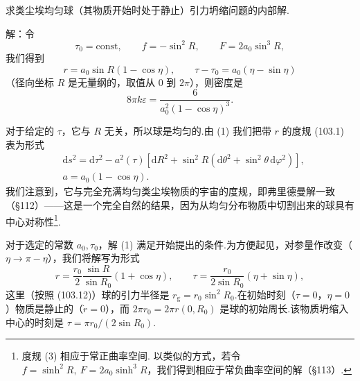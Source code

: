 \begin{xiti}

\quad 求类尘埃均匀球（其物质开始时处于静止）引力坍缩问题的内部解.

解：令
\begin{equation*}
  \tau_0=\mathrm{const},\qquad
  f=-\sin^{2}R,\qquad
  F=2a_0\sin^{3}R,
\end{equation*}
我们得到
\begin{equation}
  r=a_0\sin R(1-\cos\eta),\qquad
  \tau-\tau_0=a_0(\eta-\sin\eta)
  \tag{1}
\end{equation}
（径向坐标 $R$ 是无量纲的，取值从 0 到 $2\pi$），则密度是
\begin{equation}
  8\pi k\varepsilon=\frac{6}{a_0^{2}(1-\cos\eta)^{3}}.
  \tag{2}
\end{equation}

对于给定的 $\tau$，它与 $R$ 无关，所以球是均匀的.由 (1) 我们把带 $r$ 的度规 (103.1) 表为形式
\begin{equation}
\begin{aligned}
  &\mathrm{d}s^{2}=\mathrm{d}\tau^{2}
  -a^{2}(\tau)\left[\mathrm{d}R^{2}
  +\sin^{2}R(\mathrm{d}\theta^{2}
  +\sin^{2}\theta\,\mathrm{d}\varphi^{2})\right],\\
  &a=a_0(1-\cos\eta).
\end{aligned}
\tag{3}
\end{equation}
我们注意到，它与完全充满均匀类尘埃物质的宇宙的度规，即弗里德曼解一致（§112）——这是一个完全自然的结果，因为从均匀分布物质中切割出来的球具有中心对称性\footnote{度规 (3) 相应于常正曲率空间. 以类似的方式，若令 $f=\sinh^{2}R,\ F=2a_{0}\sinh^{3}R$，我们得到相应于常负曲率空间的解（§113）.}.

对于选定的常数 $a_0,\tau_0$，解 (1) 满足开始提出的条件.为方便起见，对参量作改变（$\eta\to\pi-\eta$），我们将解写为形式
\begin{equation}
  r=\frac{r_0}{2}\frac{\sin R}{\sin R_0}(1+\cos\eta),
  \qquad
  \tau=\frac{r_0}{2\sin R_0}(\eta+\sin\eta),
  \tag{4}
\end{equation}
这里（按照 (103.12)）球的引力半径是 $r_{\mathrm{g}}=r_0\sin^{2}R_0$.在初始时刻（$\tau=0$，$\eta=0$）物质是静止的（$\dot{r}=0$），而 $2\pi r_0=2\pi r(0,R_0)$ 是球的初始周长.该物质坍缩入中心的时刻是 $\tau=\pi r_0/(2\sin R_0)$.


\end{xiti}
